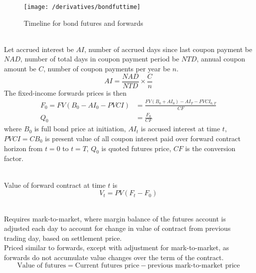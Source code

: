\begin{figure}[H]
\centering
\texttt{[image: /derivatives/bondfuttime]}
\caption{Timeline for bond futures and forwards}
\end{figure}

\begin{method} \\
Let accrued interest be $AI$, number of accrued days since last coupon payment be $NAD$, number of total days in coupon payment period be $NTD$, annual coupon amount be $C$, number of coupon payments per year be $n$.
\begin{equation}
AI = \frac{NAD}{NTD} \times \frac{C}{n} \nonumber
\end{equation}
The fixed-income forwards prices is then
\begin{align}
F_0 = FV(B_0 - AI_0 - PVCI) &= \frac{FV(B_0+AI_0) - AI_T - FVCI_{0,T}}{CF} \nonumber \\
Q_0 &= \frac{F_0}{CF} \nonumber
\end{align}
where $B_0$ is full bond price at initiation, $AI_t$ is accused interest at time $t$, $PVCI = CB_0$ is present value of all coupon interest paid over forward contract horizon from $t = 0$ to $t = T$, $Q_0$ is quoted futures price, $CF$ is the conversion factor.
\end{method}

\begin{method} \\
Value of forward contract at time $t$ is
\begin{equation}
V_t = PV(F_t - F_0) \nonumber
\end{equation}
\end{method}

\begin{remark} \\
Requires mark-to-market, where margin balance of the futures account is adjusted each day to account for change in value of contract from previous trading day, based on settlement price.\\
Priced similar to forwards, except with adjustment for mark-to-market, as forwards do not accumulate value changes over the term of the contract.
\begin{equation}
\text{Value of futures} = \text{Current futures price} - \text{previous mark-to-market price} \nonumber
\end{equation}
\end{remark}

